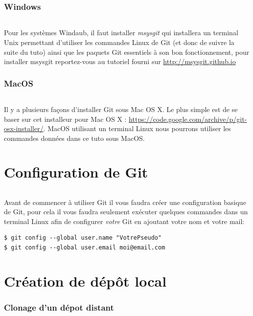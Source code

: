 \documentclass[french, a4paper, 12pt, titlepage]{article}
\begin{document}
\section{Windows}
\paragraph{}Pour les systèmes Windaub, il faut installer \emph{msysgit} qui installera un terminal Unix permettant d'utiliser les commandes Linux de Git (et donc de suivre la suite du tuto) ainsi que les paquets Git essentiels à son bon fonctionnement, pour installer msysgit reportez-vous au tutoriel fourni sur \url{http://msysgit.github.io}

\section{MacOS}
\paragraph{}Il y a plusieurs façons d’installer Git sous Mac OS X. Le plus simple est de se baser sur cet installeur pour Mac OS X :
\url{https://code.google.com/archive/p/git-osx-installer/}.
MacOS utilisant un terminal Linux nous pourrons utiliser les commandes données dans ce tuto sous MacOS.

\newpage
\part{Configuration de Git}
\paragraph{}Avant de commencer à utiliser Git il vous faudra créer une configuration basique de Git, pour cela il vous faudra seulement exécuter quelques commandes dans un terminal Linux afin de configurer \emph{votre} Git en ajoutant votre nom et votre mail:
\begin{lstlisting}
$ git config --global user.name "VotrePseudo"
$ git config --global user.email moi@email.com
\end{lstlisting}

\newpage
\part{Création de dépôt local}

\section{Clonage d'un dépot distant}
\end{document}
